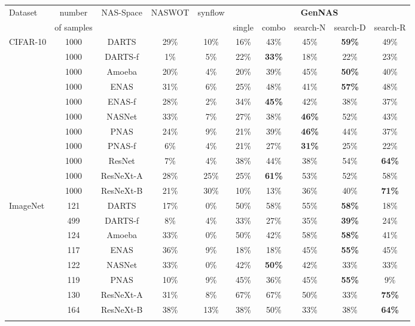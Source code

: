 \documentclass{article}
\begin{document}
\begin{table}[!h]
\begin{tabular}{lcccc|ccccc}
\Xhline{0.8pt}
\multicolumn{10}{l}{\textbf{Neural Design Spaces}} \\ \hline
Dataset &number & NAS-Space & NASWOT & synflow &  \multicolumn{5}{c}{\textbf{GenNAS}}  \\ \cline{6-10}
 & of samples&& & & single & combo & search-N & search-D & search-R \\\hline
CIFAR-10 &1000& DARTS & 29\%&10\%&16\%&43\%&45\%&\textbf{59\%}&49\%\\
&1000& DARTS-f & 1\%&5\%&	22\%&	\textbf{33\%}&	18\%&	22\%&	23\%\\
&1000& Amoeba & 20\%&	4\%&	20\%&	39\%&	45\%&	\textbf{50\%}&	40\%\\
&1000& ENAS & 31\%&	6\%&	25\%&	48\%&	41\%&	\textbf{57\%}&	48\%\\
&1000& ENAS-f & 28\%&	2\%&	34\%&	\textbf{45\%}&	42\%&	38\%&	37\%\\
&1000& NASNet &  33\%&	7\%&	27\%&	38\%&	\textbf{46\%}&	52\%&	43\%\\
&1000& PNAS &  24\%&	9\%&	21\%&	39\%&	\textbf{46\%}&	44\%&	37\%\\
&1000& PNAS-f &  6\%&	4\%&	21\%&	27\%&	\textbf{31\%}&	25\%&	22\%\\
&1000& ResNet & 7\%&	4\%&	38\%&	44\%&	38\%&	54\%&	\textbf{64\%}\\
&1000& ResNeXt-A & 28\%&	25\%&	25\%&	\textbf{61\%}&	53\%&	52\%&	58\%\\
&1000& ResNeXt-B & 21\%&	30\%&	10\%&	13\%&	36\%&	40\%&	\textbf{71\%}\\

\hline

ImageNet &121& DARTS & 17\%&	0\%&	50\%&	58\%&	55\%&	\textbf{58\%}&	18\%\\
 &499& DARTS-f & 8\%&	4\%&	33\%&	27\%&	35\%&	\textbf{39\%}&	24\%\\
 &124& Amoeba & 33\%&	0\%&	50\%&	42\%&	58\%&	\textbf{58\%}&	41\%\\
 &117& ENAS &  36\%&	9\%&	18\%&	18\%&	45\%&	\textbf{55\%}&	45\%\\
 &122& NASNet &33\%&	0\%&	42\%&	\textbf{50\%}&	42\%&	33\%&	33\%\\
 &119& PNAS & 10\%&	9\%&	45\%&	36\%&	45\%&	\textbf{55\%}&	9\%\\
 &130& ResNeXt-A & 31\%&	8\%&	67\%&	67\%&	50\%&	33\%&	\textbf{75\%}\\
 &164& ResNeXt-B &38\%&	13\%&	38\%&	50\%&	33\%&	38\%&	\textbf{64\%}\\
\Xhline{0.8pt}
\end{tabular}


\end{table}
\end{document}
